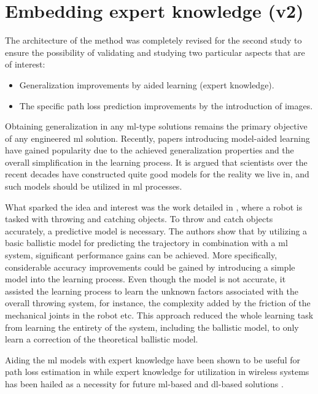 \section{Embedding expert knowledge (v2)}\label{sec:expert_v2}
The architecture of the method was completely revised for the second study to ensure the possibility of validating and studying two particular aspects that are of interest:

\begin{itemize}
    \item Generalization improvements by aided learning (expert knowledge).
    \item The specific path loss prediction improvements by the introduction of images.
\end{itemize}

Obtaining generalization in any \gls{ml}-type solutions remains the primary objective of any engineered \gls{ml} solution. Recently, papers introducing model-aided learning have gained popularity due to the achieved generalization properties and the overall simplification in the learning process. It is argued that scientists over the recent decades have constructed quite good models for the reality we live in, and such models should be utilized in \gls{ml} processes. 

What sparked the idea and interest was the work detailed in \cite{Zheng2016}, where a robot is tasked with throwing and catching objects. To throw and catch objects accurately, a predictive model is necessary. The authors show that by utilizing a basic ballistic model for predicting the trajectory in combination with a \gls{ml} system, significant performance gains can be achieved. More specifically, considerable accuracy improvements could be gained by introducing a simple model into the learning process. Even though the model is not accurate, it assisted the learning process to learn the unknown factors associated with the overall throwing system, for instance, the complexity added by the friction of the mechanical joints in the robot etc. This approach reduced the whole learning task from learning the entirety of the system, including the ballistic model, to only learn a correction of the theoretical ballistic model.

Aiding the \gls{ml} models with expert knowledge have been shown to be useful for path loss estimation in \cite{Cavalcanti2017} while expert knowledge for utilization in wireless systems has been hailed as a necessity for future \gls{ml}-based and \gls{dl}-based solutions \cite{Zappone2019}.

